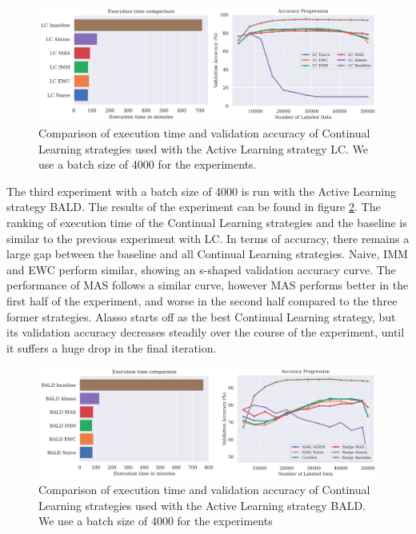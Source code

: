 \begin{figure}[h]
    \centering
    \includegraphics[width=\linewidth]{images/results_CAL/LC_CAL_4000b.png}
    \caption[Continual Active Learning LC 4000 batch size]{Comparison of execution time and validation accuracy of Continual Learning strategies used with the Active Learning strategy
    LC. We use a batch size of 4000 for the experiments. }
    \label{fig:Evaluation:Results:CAL:LC4000}
\end{figure}

The third experiment with a batch size of 4000 is run with the Active Learning strategy BALD. The results of the experiment can be found in figure \ref{fig:Evaluation:Results:CAL:BALD4000}. The ranking of execution time of the Continual
Learning strategies and the baseline is similar to the previous experiment with LC. In terms of accuracy, there remains a large gap between the baseline and all Continual Learning strategies. Naive, IMM and EWC perform similar, showing an
s-shaped validation accuracy curve. The performance of MAS follows a similar curve, however MAS performs better in the first half of the experiment, and worse in the second half compared to the three former strategies. Alasso starts off as
the best Continual Learning strategy, but its validation accuracy decreases steadily over the course of the experiment, until it suffers a huge drop in the final iteration. \par 

\begin{figure}[h]
    \centering
    \includegraphics[width=\linewidth]{images/results_CAL/Bald_CAL_4000b.png}
    \caption[Continual Active Learning BALD 4000 batch size]{Comparison of execution time and validation accuracy of Continual Learning strategies used with the Active Learning strategy
    BALD. We use a batch size of 4000 for the experiments }
    \label{fig:Evaluation:Results:CAL:BALD4000}
\end{figure}

